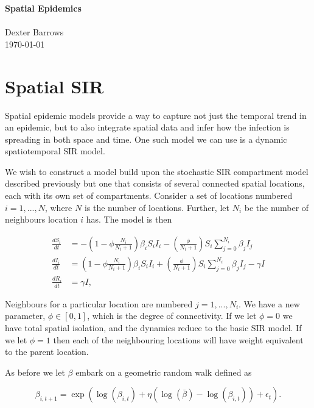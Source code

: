 \documentclass[12pt]{article}
\begin{document}
\noindent
{\LARGE {\bf Spatial Epidemics} }
\\\\
Dexter Barrows\\
\today

\section{Spatial SIR}

	Spatial epidemic models provide a way to capture not just the temporal trend in an epidemic, but to also integrate spatial data and infer how the infection is spreading in both space and time. One such model we can use is a dynamic spatiotemporal SIR model.

	We wish to construct a model build upon the stochastic SIR compartment model described previously but one that consists of several connected spatial locations, each with its own set of compartments. Consider a set of locations numbered $i = 1, ..., N$, where $N$ is the number of locations. Further, let $N_i$ be the number of neighbours location $i$ has. The model is then

	\begin{equation}
		\begin{aligned}
			\frac{dS_i}{dt} & = - \left( 1 - \phi \frac{N_i}{N_i + 1} \right) \beta_i S_i I_i - \left( \frac{\phi}{N_i + 1} \right) S_i \sum_{j = 0}^{N_i} \beta_j I_j \\
			\frac{dI_i}{dt} & = \left( 1 - \phi \frac{N_i}{N_i + 1} \right) \beta_i S_i I_i + \left( \frac{\phi}{N_i + 1} \right) S_i \sum_{j = 0}^{N_i} \beta_j I_j - \gamma I \\
			\frac{dR_i}{dt} & = \gamma I,
		\end{aligned}
	\end{equation}
    
	Neighbours for a particular location are numbered $j = 1, ..., N_i$. We have a new parameter, $\phi \in [0,1]$, which is the degree of connectivity. If we let $\phi = 0$ we have total spatial isolation, and the dynamics reduce to the basic SIR model. If we let $\phi = 1$ then each of the neighbouring locations will have weight equivalent to the parent location.

	As before we let $\beta$ embark on a geometric random walk defined as

	\begin{equation}
		\beta_{i, t+1} = \exp \left( \log(\beta_{i, t}) + \eta (\log(\bar{\beta}) - \log(\beta_{i, t})) + \epsilon_{t} \right).
	\end{equation}
	
\end{document}
